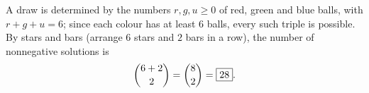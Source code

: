 A draw is determined by the numbers $r,g,u\ge0$ of red, green and blue balls, with $r+g+u=6$; since each colour has at least $6$ balls, every such triple is possible. By stars and bars (arrange $6$ stars and $2$ bars in a row), the number of nonnegative solutions is
\[\dbinom{6+2}{2}=\dbinom82=\boxed{28}.\]
